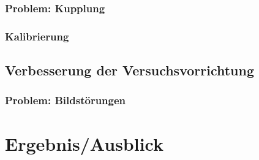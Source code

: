 \documentclass[
    11pt,
    ngerman
]{scrreprt}
\begin{document}
\subsection{Problem: Kupplung}

\subsection{Kalibrierung}

\section{Verbesserung der Versuchsvorrichtung}

\subsection{Problem: Bildstörungen}

\chapter{Ergebnis/Ausblick}
\end{document}
